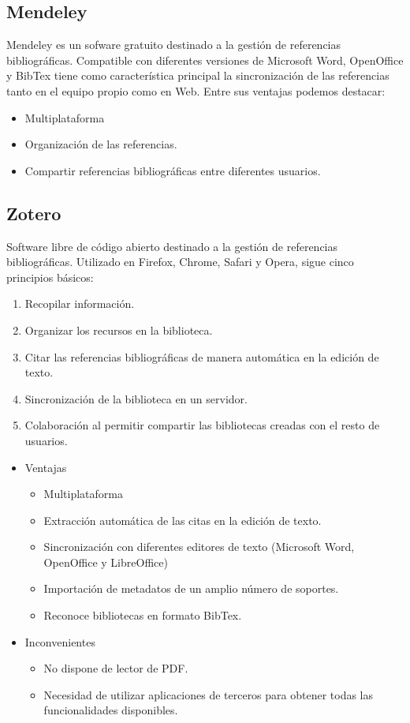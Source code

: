 \subsection{Mendeley}
Mendeley es un sofware  gratuito destinado a la gestión de referencias bibliográficas. Compatible con diferentes versiones de Microsoft Word, OpenOffice y BibTex tiene como característica principal la sincronización de las referencias tanto en el equipo  propio como en Web. \nocite{ucm:mendeley}
Entre sus ventajas podemos destacar: 
\begin{itemize}
\item Multiplataforma
\item Organización de las referencias. 
\item Compartir referencias bibliográficas entre diferentes usuarios. 

\end{itemize}
\subsection{Zotero}
Software libre de código abierto destinado a la gestión de referencias bibliográficas. \cite{bibl:zotero} Utilizado en Firefox, Chrome, Safari y Opera, sigue cinco principios básicos: 
\begin{enumerate}
\item Recopilar información. 
\item Organizar los recursos en la biblioteca. 
\item Citar las referencias bibliográficas de manera automática en la edición de texto. 
\item Sincronización de la biblioteca en un servidor. 
\item Colaboración al permitir compartir las bibliotecas creadas con el resto de usuarios. 
\end{enumerate}
\begin{itemize}
\item Ventajas
\begin{itemize}
\item Multiplataforma
\item Extracción automática de las citas en la edición de texto. 
\item Sincronización con diferentes editores de texto (Microsoft Word, OpenOffice y LibreOffice)\cite{wiki:Zotero}
\item Importación de metadatos de  un amplio número de soportes.
\item Reconoce bibliotecas en formato BibTex.
\end{itemize}
\end{itemize}
\begin{itemize}
\item Inconvenientes
\begin{itemize}
\item No dispone de lector de PDF. 
\item Necesidad de utilizar aplicaciones de terceros para obtener todas las funcionalidades disponibles. 
\end{itemize}
\end{itemize}
